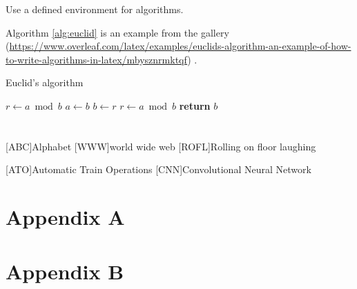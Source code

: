 \documentclass[Master,MDS,english]{BASE/twbook} %
\begin{document}
Use a defined environment for algorithms.

Algorithm \ref{alg:euclid} is an example from the gallery (\url{https://www.overleaf.com/latex/examples/euclids-algorithm-an-example-of-how-to-write-algorithms-in-latex/mbysznrmktqf}) .
\begin{algorithm}
\caption{Euclid’s algorithm}\label{alg:euclid}
\begin{algorithmic}[1]
\State $r\gets a\bmod b$
\State $a\gets b$
\State $b\gets r$
\State $r\gets a\bmod b$
\EndWhile\label{euclidendwhile}
\State \textbf{return} $b$
\EndProcedure
\end{algorithmic}
\end{algorithm}
\clearpage                                                       %


\clearpage

\listoffigures                                                   %
\clearpage

\listoftables                                                    %
\clearpage

\listoflistings                                                  %
\clearpage

{}
\chapter*{\listacroname}
\begin{acronym}[XXXXX]
    [ABC]{Alphabet}
    [WWW]{world wide web}
    [ROFL]{Rolling on floor laughing}
    
    
    
    [ATO]{Automatic Train Operations}
    [CNN]{Convolutional Neural Network}
    
\end{acronym}
\clearpage
\appendix
\chapter{Appendix A}
\clearpage
\chapter{Appendix B}
\end{document}
